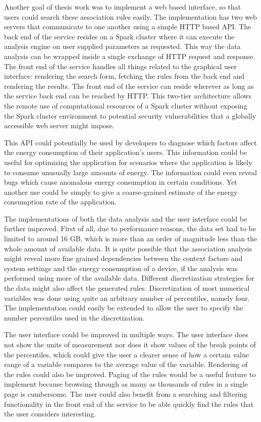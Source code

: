 Another goal of thesis work was to implement a web based interface, so that users could search these association rules easily. The implementation has two web servers that communicate to one another using a simple HTTP based API. The back end of the service resides on a Spark cluster where it can execute the analysis engine on user supplied parameters as requested. This way the data analysis can be wrapped inside a single exchange of HTTP request and response. The front end of the service handles all things related to the graphical user interface: rendering the search form, fetching the rules from the back end and rendering the results. The front end of the service can reside wherever as long as the service back end can be reached by HTTP. This two-tier architecture allows the remote use of computational resources of a Spark cluster without exposing the Spark cluster environment to potential security vulnerabilities that a globally accessible web server might impose.

This API could potentially be used by developers to diagnose which factors affect the energy consumption of their application's users. This information could be useful for optimizing the application for scenarios where the application is likely to consume unusually large amounts of energy. The information could even reveal bugs which cause anomalous energy consumption in certain conditions. Yet another use could be simply to give a coarse-grained estimate of the energy consumption rate of the application.       

The implementations of both the data analysis and the user interface could be further improved. First of all, due to performance reasons, the data set had to be limited to around 16 GB, which is more than an order of magnitude less than the whole amount of available data. It is quite possible that the association analysis might reveal more fine grained dependencies between the context factors and system settings and the energy consumption of a device, if the analysis was performed using more of the available data. Different discretization strategies for the data might also affect the generated rules. Discretization of most numerical variables was done using quite an arbitrary number of percentiles, namely four. The implementation could easily be extended to allow the user to specify the number percentiles used in the discretization.

The user interface could be improved in multiple ways. The user interface does not show the units of measurement nor does it show values of the break points of the percentiles, which could give the user a clearer sense of how a certain value range of a variable compares to the average value of the variable. Rendering of the rules could also be improved. Paging of the rules would be a useful feature to implement because browsing through as many as thousands of rules in a single page is cumbersome. The user could also benefit from a searching and filtering functionality in the front end of the service to be able quickly find the rules that the user considers interesting.

     